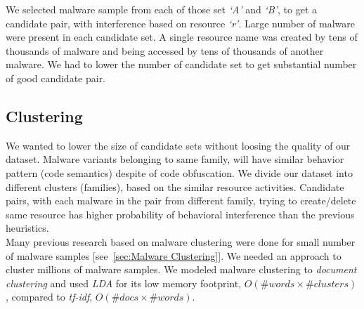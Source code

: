 We selected malware sample from each of those set \emph{`A'} and \emph{`B'}, to get a candidate pair, with interference based on resource \emph{`r'}.
Large number of malware were present in each candidate set. A single resource name was created by tens of thousands of malware and being accessed by tens of thousands of another malware.
We had to lower the number of candidate set to get substantial number of good candidate pair.

\subsection{Clustering}
\label{sub:Clustering}
We wanted to lower the size of candidate sets without loosing the quality of our dataset.
Malware variants belonging to same family, will have similar behavior pattern (code semantics) despite of code obfuscation.
We divide our dataset into different clusters (families), based on the similar resource activities.
Candidate pairs, with each malware in the pair from different family, trying to create/delete same resource has higher probability of behavioral interference than the previous heuristics.\\

Many previous research based on malware clustering were done for small number of malware samples [see~\autoref{sec:Malware Clustering}].
We needed an approach to cluster millions of malware samples.
We modeled malware clustering to \emph{document clustering} and used \emph{LDA} for its low memory footprint, $O(\#words\times \#clusters)$, compared to \emph{tf-idf}, $O(\#docs \times \#words)$.
